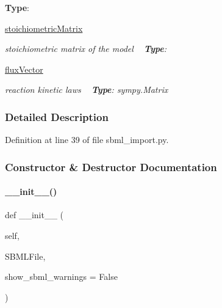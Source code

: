 \begin{DoxyCompactItemize}
\begin{DoxyCompactList}
{\bfseries{Type}}\+: \end{DoxyCompactList}\item 
\mbox{\label{classamici_1_1sbml__import_1_1_sbml_importer_ad30bd1a098329211e7618dd1065d7067}} 
\mbox{\hyperlink{classamici_1_1sbml__import_1_1_sbml_importer_ad30bd1a098329211e7618dd1065d7067}{stoichiometric\+Matrix}}
\begin{DoxyCompactList}\small\item\em stoichiometric matrix of the model ~\newline
{\bfseries{Type}}\+: \end{DoxyCompactList}\item 
\mbox{\label{classamici_1_1sbml__import_1_1_sbml_importer_aa7c12a1cbbde8c960bfaae2ac64f8845}} 
\mbox{\hyperlink{classamici_1_1sbml__import_1_1_sbml_importer_aa7c12a1cbbde8c960bfaae2ac64f8845}{flux\+Vector}}
\begin{DoxyCompactList}\small\item\em reaction kinetic laws ~\newline
{\bfseries{Type}}\+: sympy.\+Matrix \end{DoxyCompactList}\end{DoxyCompactItemize}


\subsubsection{Detailed Description}


Definition at line 39 of file sbml\+\_\+import.\+py.



\subsubsection{Constructor \& Destructor Documentation}
\mbox{\label{classamici_1_1sbml__import_1_1_sbml_importer_a93a0e19925c5c5080bf4b02249e069af}} 
\paragraph{\texorpdfstring{\_\_init\_\_()}{\_\_init\_\_()}}
{\footnotesize\ttfamily def \+\_\+\+\_\+init\+\_\+\+\_\+ (\begin{DoxyParamCaption}\item[{}]{self,  }\item[{}]{S\+B\+M\+L\+File,  }\item[{}]{show\+\_\+sbml\+\_\+warnings = {\ttfamily False} }\end{DoxyParamCaption})}


